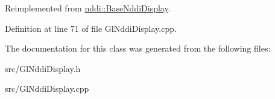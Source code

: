 Reimplemented from \hyperlink{classnddi_1_1_base_nddi_display_ad6e5385ce6ea17f11e3ea404a123d1d7}{nddi::BaseNddiDisplay}.



Definition at line 71 of file GlNddiDisplay.cpp.



The documentation for this class was generated from the following files:\begin{DoxyCompactItemize}
\item 
src/GlNddiDisplay.h\item 
src/GlNddiDisplay.cpp\end{DoxyCompactItemize}
